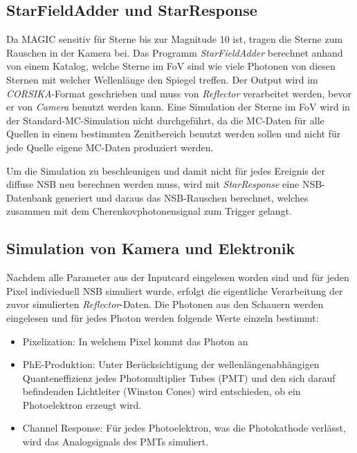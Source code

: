 \subsection{StarFieldAdder und StarResponse}
Da MAGIC sensitiv für Sterne bis zur Magnitude 10 ist, tragen die Sterne zum Rauschen in der Kamera bei.
Das Programm \textit{StarFieldAdder} berechnet anhand von einem Katalog, welche Sterne im FoV sind wie viele Photonen von diesen Sternen mit welcher Wellenlänge den Spiegel treffen.
Der Output wird im \textit{CORSIKA}-Format geschrieben und muss von \textit{Reflector} verarbeitet werden, bevor er von \textit{Camera} benutzt werden kann.
Eine Simulation der Sterne im FoV wird in der Standard-MC-Simulation nicht durchgeführt, da die MC-Daten für alle Quellen in einem bestimmten Zenitbereich benutzt werden sollen und nicht für jede Quelle eigene MC-Daten produziert werden.

Um die Simulation zu beschleunigen und damit nicht für jedes Ereignis der diffuse NSB neu berechnen werden muss, wird mit \textit{StarResponse} eine NSB-Datenbank generiert und daraus das NSB-Rauschen berechnet, welches zusammen mit dem Cherenkovphotonensignal zum Trigger gelangt.

\subsection{Simulation von Kamera und Elektronik}
Nachdem alle Parameter aus der Inputcard eingelesen worden sind und für jeden Pixel indivieduell NSB simuliert wurde, erfolgt die eigentliche Verarbeitung der zuvor simulierten \textit{Reflector}-Daten.
Die Photonen aus den Schauern werden eingelesen und für jedes Photon werden folgende Werte einzeln bestimmt:

\begin{itemize}
 \item Pixelization: In welchem Pixel kommt das Photon an
 \item PhE-Produktion: Unter Berücksichtigung der wellenlängenabhängigen Quanteneffizienz jedes Photomultiplier Tubes (PMT) und den sich darauf befindenden Lichtleiter (Winston Cones) wird entschieden, ob ein Photoelektron erzeugt wird.
 \item Channel Response: Für jedes Photoelektron, was die Photokathode verlässt, wird das Analogsignals des PMTs simuliert.
\end{itemize}

